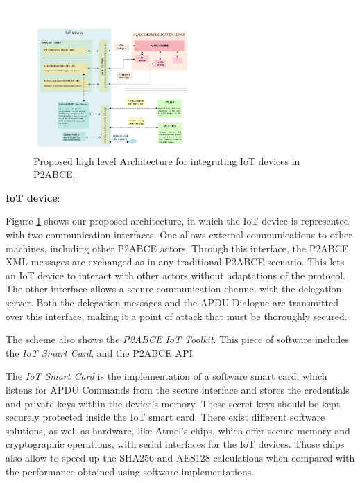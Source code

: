 \begin{figure}[htb!]
	\centering
	\includegraphics[width=0.7\textwidth]{gfx/P2ABCE-IoT-color}
	\caption{Proposed high level Architecture for integrating IoT devices in P2ABCE.}
	\label{fig:P2ABCE-IoT}
\end{figure}



\begin{flushleft}
	\textbf{IoT device}:
\end{flushleft}
	
	Figure \ref{fig:P2ABCE-IoT} shows our proposed architecture, in which the IoT device is represented with two communication interfaces. One allows external communications to other machines, including other P2ABCE actors. Through this interface, the P2ABCE XML messages are exchanged as in any traditional P2ABCE scenario. This lets an IoT device to interact with other actors without adaptations of the protocol. The other interface allows a secure communication channel with the delegation server. Both the delegation messages and the APDU Dialogue are transmitted over this interface, making it a point of attack that must be thoroughly secured.
	
	The scheme also shows the \textit{P2ABCE IoT Toolkit}. This piece of software includes the \textit{IoT Smart Card}, and the P2ABCE API.
	
	The \textit{IoT Smart Card} is the implementation of a software smart card, which listens for APDU Commands from the secure interface and stores the credentials and private keys within the device's memory. 
	These secret keys should be kept securely protected inside the IoT smart card. There exist different software solutions, as well as hardware, like Atmel's chips, which offer secure memory and cryptographic operations, with serial interfaces for the IoT devices. Those chips also allow to speed up the SHA256 and AES128 calculations when compared with the performance obtained using software implementations.
	
